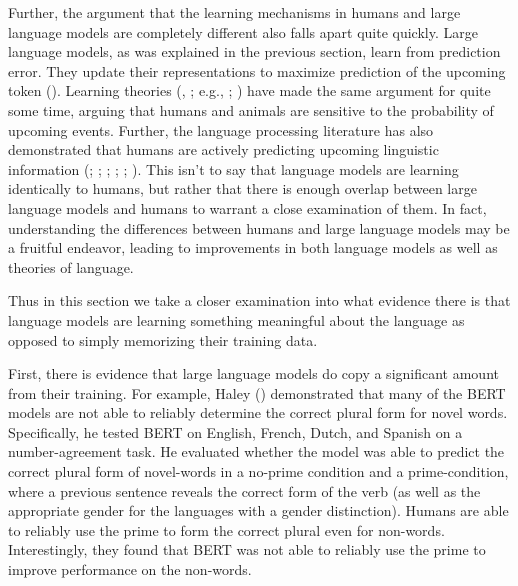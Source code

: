 \documentclass[
  12pt,
  letterpaper,
]{scrreprt}
\begin{document}
Further, the argument that the learning mechanisms in humans and large
language models are completely different also falls apart quite quickly.
Large language models, as was explained in the previous section, learn
from prediction error. They update their representations to maximize
prediction of the upcoming token
().
Learning theories (,
; e.g.,
;
)
have made the same argument for quite some time, arguing that humans and
animals are sensitive to the probability of upcoming events. Further,
the language processing literature has also demonstrated that humans are
actively predicting upcoming linguistic information
(;
;
; ;
;
). This isn't to say that language models are learning identically
to humans, but rather that there is enough overlap between large
language models and humans to warrant a close examination of them. In
fact, understanding the differences between humans and large language
models may be a fruitful endeavor, leading to improvements in both
language models as well as theories of language.

Thus in this section we take a closer examination into what evidence
there is that language models are learning something meaningful about
the language as opposed to simply memorizing their training data.

First, there is evidence that large language models do copy a
significant amount from their training. For example, Haley
() demonstrated that many of
the BERT models are not able to reliably determine the correct plural
form for novel words. Specifically, he tested BERT on English, French,
Dutch, and Spanish on a number-agreement task. He evaluated whether the
model was able to predict the correct plural form of novel-words in a
no-prime condition and a prime-condition, where a previous sentence
reveals the correct form of the verb (as well as the appropriate gender
for the languages with a gender distinction). Humans are able to
reliably use the prime to form the correct plural even for non-words.
Interestingly, they found that BERT was not able to reliably use the
prime to improve performance on the non-words.
\end{document}
